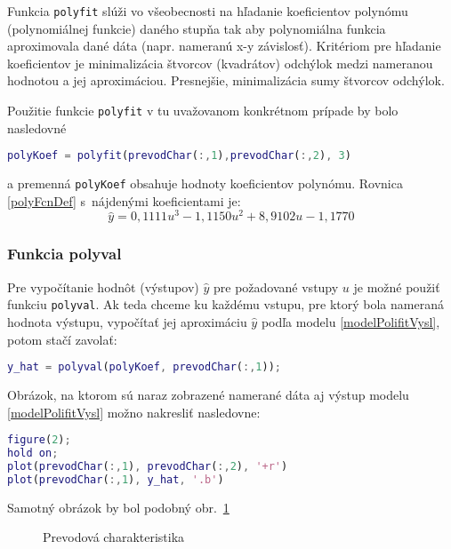 \documentclass[a4paper, 10pt, ]{article}
\begin{document}
Funkcia \verb|polyfit| slúži vo všeobecnosti na hľadanie koeficientov polynómu (polynomiálnej funkcie) daného stupňa tak aby polynomiálna funkcia aproximovala dané dáta (napr. nameranú x-y závislosť). Kritériom pre hľadanie koeficientov je minimalizácia štvorcov (kvadrátov) odchýlok medzi nameranou hodnotou a jej aproximáciou. Presnejšie, minimalizácia sumy štvorcov odchýlok.

Použitie funkcie \verb|polyfit| v tu uvažovanom konkrétnom prípade by bolo nasledovné
\begin{lstlisting}[language=Matlab, numbers=none]
polyKoef = polyfit(prevodChar(:,1),prevodChar(:,2), 3)
\end{lstlisting}
a premenná \verb|polyKoef| obsahuje hodnoty koeficientov polynómu. Rovnica \eqref{polyFcnDef} s~nájdenými koeficientami je:
\begin{equation} \label{modelPolifitVysl}
    \hat y = 0,1111 u^3  -1,1150 u^2 + 8,9102 u  -1,1770
\end{equation}


\subsubsection{Funkcia polyval}

Pre vypočítanie hodnôt (výstupov) $\hat y$ pre požadované vstupy $u$ je možné použiť funkciu \verb|polyval|. Ak teda chceme ku každému vstupu, pre ktorý bola nameraná hodnota výstupu, vypočítať jej aproximáciu $\hat y$ podľa modelu \eqref{modelPolifitVysl}, potom stačí zavolať:
\begin{lstlisting}[language=Matlab, numbers=none]
y_hat = polyval(polyKoef, prevodChar(:,1));
\end{lstlisting}
Obrázok, na ktorom sú naraz zobrazené namerané dáta aj výstup modelu \eqref{modelPolifitVysl} možno nakresliť nasledovne:
\begin{lstlisting}[language=Matlab, numbers=none]
figure(2);
hold on;
plot(prevodChar(:,1), prevodChar(:,2), '+r')
plot(prevodChar(:,1), y_hat, '.b')
\end{lstlisting}
Samotný obrázok by bol podobný obr.~\ref{Prevodová charakteristika namer vs model}


\begin{figure}[t]
	\centering


    \vspace{-4mm}

	\caption{Prevodová charakteristika}
	\label{Prevodová charakteristika namer vs model}

\end{figure}
\end{document}
